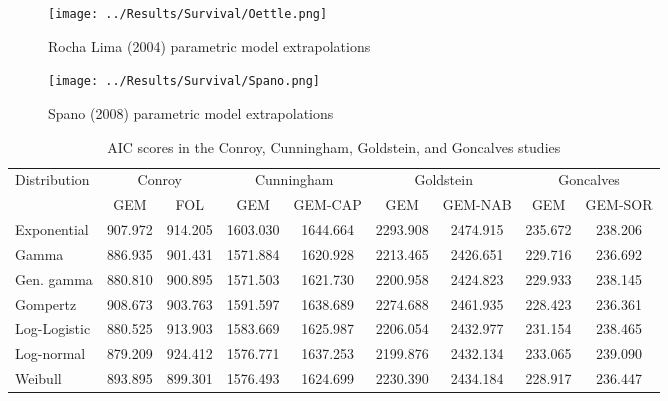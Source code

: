 \begin{figure}[h]
    \centering
    \texttt{[image: ../Results/Survival/Oettle.png]}
    \caption{Rocha Lima (2004) parametric model extrapolations}
    \label{fig:rochaLimaParamExtrap}
\end{figure}

\begin{figure}[h]
    \centering
    \texttt{[image: ../Results/Survival/Spano.png]}
    \caption{Spano (2008) parametric model extrapolations}
    \label{fig:spanoParamExtrap}
\end{figure}

\begin{table}[h]
    \centering
    \begin{tabular}{lcccccccc}
    \hline
    \multirow{2}{*}{Distribution} & \multicolumn{2}{c}{Conroy} & \multicolumn{2}{c}{Cunningham} & \multicolumn{2}{c}{Goldstein} & \multicolumn{2}{c}{Goncalves} \\ \cline{2-9} 
                                  & GEM      & FOL          & GEM            & GEM-CAP       & GEM           & GEM-NAB       & GEM           & GEM-SOR       \\ \hline
    Exponential                   & 907.972  & 914.205      & 1603.030       & 1644.664      & 2293.908      & 2474.915      & 235.672       & 238.206       \\
    Gamma                         & 886.935  & 901.431      & 1571.884       & 1620.928      & 2213.465      & 2426.651      & 229.716       & 236.692       \\
    Gen. gamma             & 880.810  & 900.895      & 1571.503       & 1621.730      & 2200.958      & 2424.823      & 229.933       & 238.145       \\
    Gompertz                      & 908.673  & 903.763      & 1591.597       & 1638.689      & 2274.688      & 2461.935      & 228.423       & 236.361       \\
    Log-Logistic                  & 880.525  & 913.903      & 1583.669       & 1625.987      & 2206.054      & 2432.977      & 231.154       & 238.465       \\
    Log-normal                    & 879.209  & 924.412      & 1576.771       & 1637.253      & 2199.876      & 2432.134      & 233.065       & 239.090       \\
    Weibull                       & 893.895  & 899.301      & 1576.493       & 1624.699      & 2230.390      & 2434.184      & 228.917       & 236.447       \\ \hline
    \end{tabular}
    \caption{AIC scores in the Conroy, Cunningham, Goldstein, and Goncalves studies}
    \label{AIC1}
\end{table}

